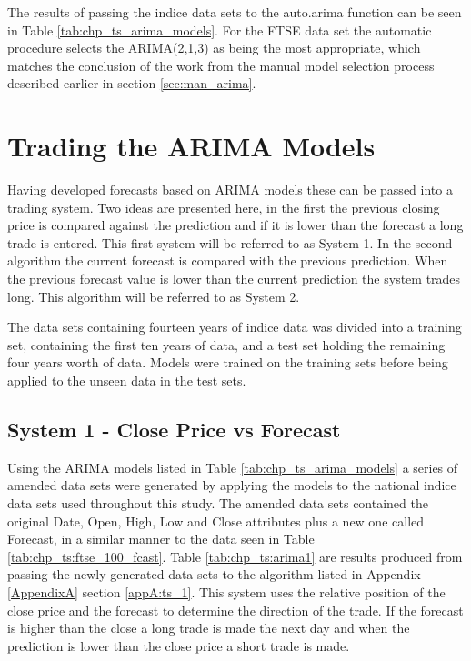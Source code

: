 The results of passing the indice data sets to the auto.arima function can be seen in Table \ref{tab:chp_ts_arima_models}. For the FTSE data set the automatic procedure selects the ARIMA(2,1,3) as being the most appropriate, which matches the conclusion of the work from the manual model selection process described earlier in section \ref{sec:man_arima}.



\section{Trading the ARIMA Models}
\label{sec:traing:arima:models}
Having developed forecasts based on ARIMA models these can be passed into a trading system. Two ideas are presented here, in the first the previous closing price is compared against the prediction and if it is lower than the forecast a long trade is entered. This first system will be referred to as System 1. In the second algorithm the current forecast is compared with the previous prediction. When the previous forecast value is lower than the current prediction the system trades long. This algorithm will be referred to as System 2.

The data sets containing fourteen years of indice data was divided into a training set, containing the first ten years of data, and a test set holding the remaining four years worth of data. Models were trained on the training sets before being applied to the unseen data in the test sets.

\subsection{System 1 - Close Price vs Forecast}
Using the ARIMA models listed in Table \ref{tab:chp_ts_arima_models} a series of amended data sets were generated by applying the models to the national indice data sets used throughout this study. The amended data sets contained the original Date, Open, High, Low and Close attributes plus a new one called Forecast, in a similar manner to the data seen in Table  \ref{tab:chp_ts:ftse_100_fcast}. Table \ref{tab:chp_ts:arima1} are results produced from passing the newly generated data sets to the algorithm listed in Appendix \ref{AppendixA} section \ref{appA:ts_1}. This system uses the relative position of the close price and the forecast to determine the direction of the trade. If the forecast is higher than the close a long trade is made the next day and when the prediction is lower than the close price a short trade is made.

